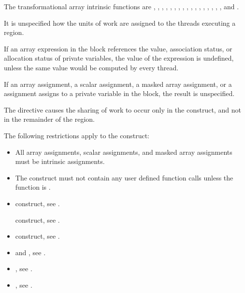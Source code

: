\begin{fortranspecific}
The transformational array intrinsic functions are , ,
, , , , ,
, , , , ,
, , , , 
, and .

It is unspecified how the units of work are assigned to the threads executing a
 region.

If an array expression in the block references the value, association status, or 
allocation status of private variables, the value of the expression is undefined, 
unless the same value would be computed by every thread.

If an array assignment, a scalar assignment, a masked array assignment, or a 
 assignment assigns to a private variable in the block, the result 
is unspecified.

The  directive causes the sharing of work to occur only in the 
 construct, and not in the remainder of the  region.


\begin{samepage}
\restrictions
The following restrictions apply to the  construct:

\begin{itemize}
\item All array assignments, scalar assignments, and masked array assignments 
      must be intrinsic assignments.
\item The construct must not contain any user defined function calls unless 
      the function is .
\end{itemize}
\end{samepage}

\crossreferences
\begin{itemize}
\item {} construct, see .

  construct, see .

\item {} construct, see .
\ITEMndo

\item {} and , see
  .

\item {}, see .

\item {}, see
.
\end{itemize}

\end{fortranspecific}
